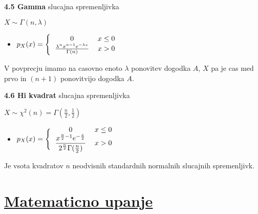 \documentclass{article}
\begin{document}
\begin{multicols}{3}
\textbf{4.5 Gamma} slucajna spremenljivka
\begin{center}
    \begin{math}
        X \sim \Gamma(n, \lambda)
    \end{math}
\end{center}

\begin{itemize}
    \item  \begin{math}
        p_{X}(x) =
        \Bigg\{\begin{tabular}{ccc}
          $0$  & $x \leq 0$ & \\
          $\frac{\lambda^{n} x^{n- 1} e^{ - \lambda x}}{\Gamma(n)}$ & $x > 0$ & \\
        \end{tabular}
    \end{math} 
\end{itemize}

V povprecju imamo na casovno enoto $\lambda$ ponovitev dogodka $A$, $X$ pa je cas med
prvo in $(n + 1)$ ponovitvijo dogodka $A$.

\textbf{4.6 Hi kvadrat} slucajna spremenljivka
\begin{center}
    \begin{math}
        X \sim \chi^{2}(n) = \Gamma(\frac{n}{2}, \frac{1}{2})
    \end{math}
\end{center}

\begin{itemize}
    \item  \begin{math}
        p_{X}(x) =
        \Bigg\{\begin{tabular}{ccc}
          $0$  & $x \leq 0$ & \\
          $\dfrac{x^{\frac{n}{2} - 1} e ^{- \frac{x}{2}}}{2^{\frac{n}{2}} \Gamma(\frac{n}{2})}$ & $x > 0$ & \\
        \end{tabular}
    \end{math} 
\end{itemize}

Je vsota kvadratov $n$ neodvisnih standardnih normalnih slucajnih spremenljivk.

\section{\underline{Matematicno upanje}}


\end{multicols}
\end{document}
